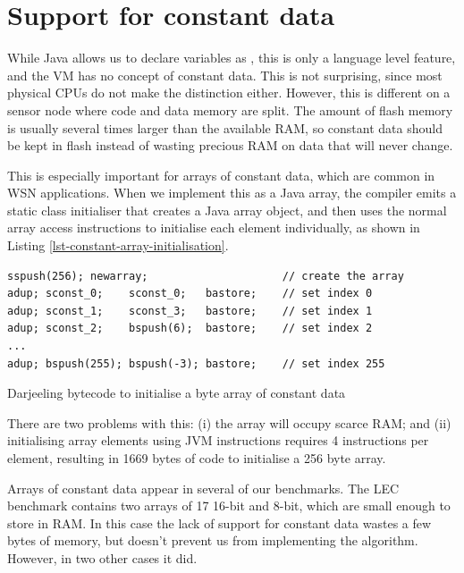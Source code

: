 \section{Support for constant data}
\label{sec-const-data}
While Java allows us to declare variables as , this is only a language level feature, and the VM has no concept of constant data. This is not surprising, since most physical CPUs do not make the distinction either. However, this is different on a sensor node where code and data memory are split. The amount of flash memory is usually several times larger than the available RAM, so constant data should be kept in flash instead of wasting precious RAM on data that will never change.

This is especially important for arrays of constant data, which are common in WSN applications. When we implement this as a  Java array, the compiler emits a static class initialiser that creates a Java array object, and then uses the normal array access instructions to initialise each element individually, as shown in Listing \ref{lst-constant-array-initialisation}.

\begin{listing}
	\centering
	\begin{verbatim}
sspush(256); newarray;                     // create the array
adup; sconst_0;    sconst_0;   bastore;    // set index 0
adup; sconst_1;    sconst_3;   bastore;    // set index 1
adup; sconst_2;    bspush(6);  bastore;    // set index 2
...
adup; bspush(255); bspush(-3); bastore;    // set index 255
	\end{verbatim}
\caption{Darjeeling bytecode to initialise a byte array of constant data}
\label{lst-constant-array-initialisation}
\end{listing}


There are two problems with this: (i) the array will occupy scarce RAM; and (ii) initialising array elements using JVM instructions requires 4 instructions per element, resulting in 1669 bytes of code to initialise a 256 byte array.

Arrays of constant data appear in several of our benchmarks. The LEC benchmark contains two arrays of 17 16-bit and 8-bit, which are small enough to store in RAM. In this case the lack of support for constant data wastes a few bytes of memory, but doesn't prevent us from implementing the algorithm. However, in two other cases it did.

